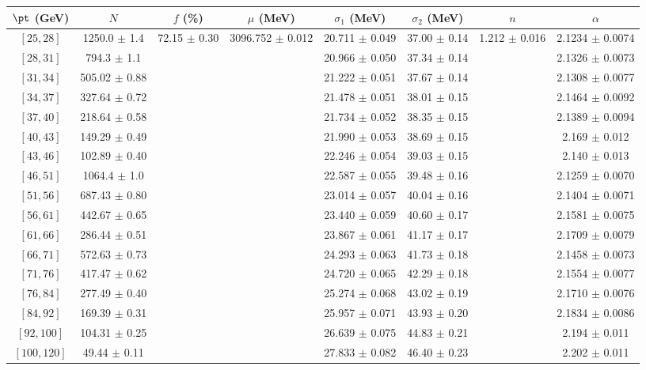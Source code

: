 \begin{tabular}{c||c|c|c|c|c|c|c}
$\pt$ (GeV) & $N$ & $f$ (\%) & $\mu$ (MeV) & $\sigma_1$ (MeV) & $\sigma_2$ (MeV) & $n$ & $\alpha$ \\
\hline
$[25, 28]$ & 1250.0 $\pm$ 1.4 & \multirow{17}{*}{72.15 $\pm$ 0.30} & \multirow{17}{*}{3096.752 $\pm$ 0.012} & 20.711 $\pm$ 0.049 & 37.00 $\pm$ 0.14 & \multirow{17}{*}{1.212 $\pm$ 0.016} & 2.1234 $\pm$ 0.0074\\
$[28, 31]$ & 794.3 $\pm$ 1.1 &  &  & 20.966 $\pm$ 0.050 & 37.34 $\pm$ 0.14 &  & 2.1326 $\pm$ 0.0073\\
$[31, 34]$ & 505.02 $\pm$ 0.88 &  &  & 21.222 $\pm$ 0.051 & 37.67 $\pm$ 0.14 &  & 2.1308 $\pm$ 0.0077\\
$[34, 37]$ & 327.64 $\pm$ 0.72 &  &  & 21.478 $\pm$ 0.051 & 38.01 $\pm$ 0.15 &  & 2.1464 $\pm$ 0.0092\\
$[37, 40]$ & 218.64 $\pm$ 0.58 &  &  & 21.734 $\pm$ 0.052 & 38.35 $\pm$ 0.15 &  & 2.1389 $\pm$ 0.0094\\
$[40, 43]$ & 149.29 $\pm$ 0.49 &  &  & 21.990 $\pm$ 0.053 & 38.69 $\pm$ 0.15 &  & 2.169 $\pm$ 0.012\\
$[43, 46]$ & 102.89 $\pm$ 0.40 &  &  & 22.246 $\pm$ 0.054 & 39.03 $\pm$ 0.15 &  & 2.140 $\pm$ 0.013\\
$[46, 51]$ & 1064.4 $\pm$ 1.0 &  &  & 22.587 $\pm$ 0.055 & 39.48 $\pm$ 0.16 &  & 2.1259 $\pm$ 0.0070\\
$[51, 56]$ & 687.43 $\pm$ 0.80 &  &  & 23.014 $\pm$ 0.057 & 40.04 $\pm$ 0.16 &  & 2.1404 $\pm$ 0.0071\\
$[56, 61]$ & 442.67 $\pm$ 0.65 &  &  & 23.440 $\pm$ 0.059 & 40.60 $\pm$ 0.17 &  & 2.1581 $\pm$ 0.0075\\
$[61, 66]$ & 286.44 $\pm$ 0.51 &  &  & 23.867 $\pm$ 0.061 & 41.17 $\pm$ 0.17 &  & 2.1709 $\pm$ 0.0079\\
$[66, 71]$ & 572.63 $\pm$ 0.73 &  &  & 24.293 $\pm$ 0.063 & 41.73 $\pm$ 0.18 &  & 2.1458 $\pm$ 0.0073\\
$[71, 76]$ & 417.47 $\pm$ 0.62 &  &  & 24.720 $\pm$ 0.065 & 42.29 $\pm$ 0.18 &  & 2.1554 $\pm$ 0.0077\\
$[76, 84]$ & 277.49 $\pm$ 0.40 &  &  & 25.274 $\pm$ 0.068 & 43.02 $\pm$ 0.19 &  & 2.1710 $\pm$ 0.0076\\
$[84, 92]$ & 169.39 $\pm$ 0.31 &  &  & 25.957 $\pm$ 0.071 & 43.93 $\pm$ 0.20 &  & 2.1834 $\pm$ 0.0086\\
$[92, 100]$ & 104.31 $\pm$ 0.25 &  &  & 26.639 $\pm$ 0.075 & 44.83 $\pm$ 0.21 &  & 2.194 $\pm$ 0.011\\
$[100, 120]$ & 49.44 $\pm$ 0.11 &  &  & 27.833 $\pm$ 0.082 & 46.40 $\pm$ 0.23 &  & 2.202 $\pm$ 0.011\\
\end{tabular}

